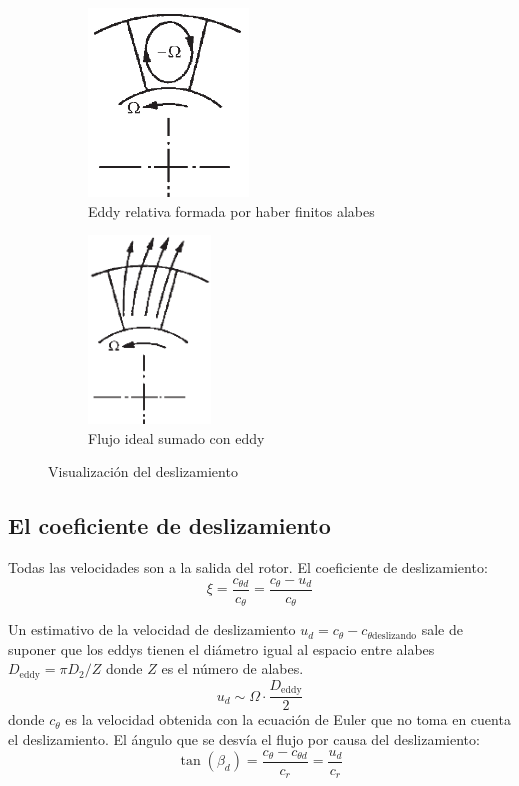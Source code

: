 \documentclass{article}
\newcommand{\ctan}[1]{\ensuremath{c_{\theta #1}}}
\newcommand{\crad}[1]{\ensuremath{c_{r #1}}}
\newcommand{\slip}{\xi}
\begin{document}
\begin{figure}[htb!]
\centering
\begin{subfigure}{.49\textwidth}
\centering
\includegraphics[height=5cm]{fig/eddydeslizamiento.png}
\caption{Eddy relativa formada por haber finitos alabes}
\label{fig:deslizamientoEddy}
\end{subfigure}%
\begin{subfigure}{.49\textwidth}
\centering
\includegraphics[height= 5cm]{fig/deslizamientoconeddy.png}
\caption{Flujo ideal sumado con eddy}
\label{fig:deslizamientoEddyMasFlujoIdeal}
\end{subfigure}
\caption{Visualización del deslizamiento}
\label{fig:explicaciondeslizamiento}
\end{figure}

\subsection{El coeficiente de deslizamiento}
Todas las velocidades son a la salida del rotor. El coeficiente de deslizamiento:
\[
\slip = \frac{\ctan{d}}{\ctan{}} = \frac{\ctan{}-u_d}{\ctan{}}
\]

Un estimativo de la velocidad de deslizamiento $u_d= \ctan{}-\ctan{\mathrm{deslizando}}$ sale de suponer que los eddys tienen el diámetro igual al espacio entre alabes $D_{\mathrm{eddy}}= \pi D_{\mathrm{2}}/Z$ donde $Z$ es el número de alabes. 
\[
u_d \sim \Omega \cdot \frac{D_{\mathrm{eddy}}}{2}
\]
donde $\ctan{}$ es la velocidad obtenida con la ecuación de Euler que no toma en cuenta el deslizamiento. El ángulo que se desvía el flujo por causa del deslizamiento:
\[
\tan (\beta_d) =\frac{\ctan{}-\ctan{d}}{\crad{}}= \frac{u_d}{\crad{}}
\]
\end{document}
